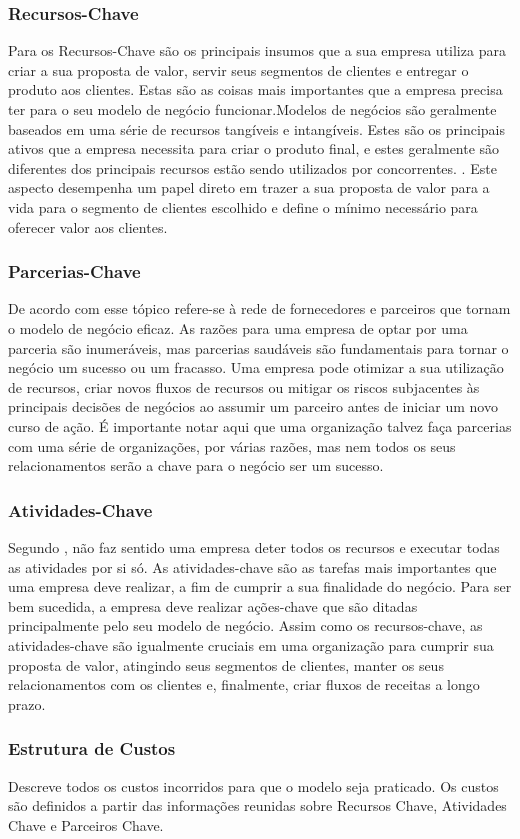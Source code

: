 \subsubsection{Recursos-Chave}
\label{cha:recursos_chave}
Para  os Recursos-Chave são os principais insumos que a sua empresa utiliza para criar a sua proposta de valor, servir seus segmentos de clientes e entregar o produto aos clientes. Estas são as coisas mais importantes que a empresa precisa ter para o seu modelo de negócio funcionar.Modelos de negócios são geralmente baseados em uma série de recursos tangíveis e intangíveis. Estes são os principais ativos que a empresa necessita para criar o produto final, e estes geralmente são diferentes dos principais recursos estão sendo utilizados por concorrentes. . Este aspecto desempenha um papel direto em trazer a sua proposta de valor para a vida para o segmento de clientes escolhido e define o mínimo necessário para oferecer valor aos clientes.

\subsubsection{Parcerias-Chave}
\label{cha:parcerias_chave}
De acordo com  esse tópico refere-se à rede de fornecedores e parceiros que
tornam o modelo de negócio eficaz. As razões para uma empresa de optar por uma parceria são inumeráveis, mas parcerias saudáveis são fundamentais para tornar o negócio um sucesso ou um
fracasso. Uma empresa pode otimizar a sua utilização de recursos, criar novos fluxos de recursos ou
mitigar os riscos subjacentes às principais decisões de negócios ao assumir um parceiro antes de
iniciar um novo curso de ação. É importante notar aqui que uma organização talvez faça parcerias com
uma série de organizações, por várias razões, mas nem todos os seus relacionamentos serão a chave
para o negócio ser um sucesso.

\subsubsection{Atividades-Chave}
\label{cha:atividades_chave}
Segundo , não faz sentido uma empresa deter todos os recursos e executar todas as atividades por si só. As atividades-chave são as tarefas mais importantes que uma empresa deve realizar, a fim de cumprir a sua finalidade do negócio. Para ser bem sucedida, a empresa deve realizar ações-chave que são ditadas principalmente pelo seu modelo de negócio. Assim como os recursos-chave, as atividades-chave são igualmente cruciais em uma organização para cumprir sua proposta de valor, atingindo seus segmentos de clientes, manter os seus relacionamentos com os clientes e, finalmente, criar fluxos de receitas a longo prazo.

\subsubsection{Estrutura de Custos}
\label{cha:estrutura_de_custos}
Descreve todos os custos incorridos para que o modelo seja praticado. Os custos são definidos a partir das informações reunidas sobre Recursos Chave, Atividades Chave e Parceiros Chave. \cite{businessmodel}